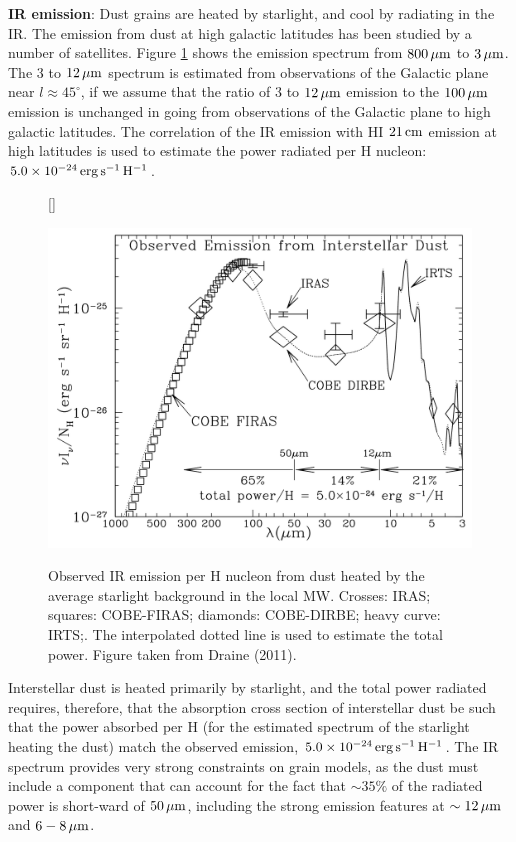 \documentclass[a4paper,10pt]{article}
\begin{document}
{\noindent}\textbf{IR emission}: Dust grains are heated by starlight, and cool by radiating in the IR. The emission from dust at high galactic latitudes has been studied by a number of satellites. Figure \ref{fig:dustir} shows the emission spectrum from $800\,\mu{\rm m}$ to $3\,\mu{\rm m}$. The $3$ to $12\,\mu{\rm m}$ spectrum is estimated from observations of the Galactic plane near $l\approx45^\circ$, if we assume that the ratio of $3$ to $12\,\mu{\rm m}$ emission to the $100\,\mu{\rm m}$ emission is unchanged in going from observations of the Galactic plane to high galactic latitudes. The correlation of the IR emission with HI $21\,{\rm cm}$ emission at high latitudes is used to estimate the power radiated per H nucleon: $5.0\times10^{-24}\,{\rm erg\,s^{-1}\,H^{-1}}$.

\begin{figure}[t]
    [\FBwidth]
    {\caption{\footnotesize{Observed IR emission per H nucleon from dust heated by the average starlight background in the local MW. Crosses: IRAS; squares: COBE-FIRAS; diamonds: COBE-DIRBE; heavy curve: IRTS;. The interpolated dotted line is used to estimate the total power. Figure taken from Draine (2011).}}
    \label{fig:dustir}}
    {\includegraphics[width=12cm]{figures/dustIR.png}}
\end{figure}

{\noindent}Interstellar dust is heated primarily by starlight, and the total power radiated requires, therefore, that the absorption cross section of interstellar dust be such that the power absorbed per H (for the estimated spectrum of the starlight heating the dust) match the observed emission, $5.0\times10^{-24}\,{\rm erg\,s^{-1}\,H^{-1}}$. The IR spectrum provides very strong constraints on grain models, as the dust must include a component that can account for the fact that $\sim35\%$ of the radiated power is short-ward of $50\,\mu{\rm m}$, including the strong emission features at $\sim12\,\mu{\rm m}$ and $6-8\,\mu{\rm m}$.
\end{document}
